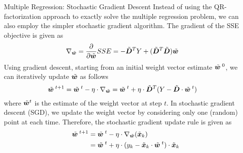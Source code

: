 \begin{frame}{Multiple Regression: Stochastic Gradient Descent}
Instead of using the QR-factorization approach to exactly solve the
multiple regression problem, we can also employ the simpler stochastic
gradient algorithm. 
The gradient of the SSE objective is given as
\begin{align*}
    \nabla_{\tilde{{\boldsymbol w}}} = 
    \frac{\partial}{\partial \tilde{{\boldsymbol w}}} SSE & = -\tilde{{\boldsymbol D}}^T Y + (\tilde{{\boldsymbol D}}^T\tilde{{\boldsymbol D}}) \tilde{{\boldsymbol w}}
\end{align*}
%
Using gradient descent, starting from an initial weight vector estimate
$\tilde{{\boldsymbol w}}^{\;0}$, we can iteratively update $\tilde{{\boldsymbol w}}$ as follows
\begin{align*}
    \tilde{{\boldsymbol w}}^{\;t+1}  &= \tilde{{\boldsymbol w}}^{\;t} - \eta \cdot \nabla_{\tilde{{\boldsymbol w}}}
    = \tilde{{\boldsymbol w}}^{\;t} + \eta \cdot \tilde{{\boldsymbol D}}^T(Y - \tilde{{\boldsymbol D}} \cdot \tilde{{\boldsymbol w}}^{\;t})
\end{align*}
where $\tilde{{\boldsymbol w}}^{t}$ is the estimate of the weight vector at step $t$.
%
In stochastic gradient descent (SGD), we update the weight vector by
considering only one (random) point at each time. 
Therefore, the stochastic gradient update rule is given as
\begin{align*}
    \tilde{{\boldsymbol w}}^{\;t+1}  &= \tilde{{\boldsymbol w}}^{\;t} - \eta \cdot \nabla_{\tilde{{\boldsymbol w}}}(\tilde{{\boldsymbol x}}_k)\\
    & = \tilde{{\boldsymbol w}}^{\;t} + \eta \cdot (y_k - \tilde{{\boldsymbol x}}_k \cdot \tilde{{\boldsymbol w}}^{\;t}) \cdot
    \tilde{{\boldsymbol x}}_k
\end{align*}
\end{frame}
%
